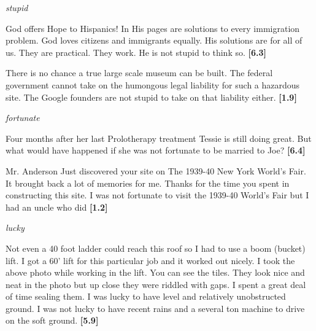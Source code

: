 \documentclass[11pt,fleqn]{article}
\newcommand{\6}{\mbox{$[\hspace*{-.6mm}[$}}
\newcommand{\9}{\mbox{$]\hspace*{-.6mm}]$}}
\begin{document}
\begin{exe}


\ex\label{stupid} {\em stupid}

\begin{xlist}

\ex God offers Hope to Hispanics! In His pages are solutions to every immigration problem. God loves citizens and immigrants equally. His solutions are for all of us. They are practical. They work. He is not stupid to think so. \hfill {\bf [6.3]}

\ex There is no chance a true large scale museum can be built. The federal government cannot take on the humongous legal liability for such a hazardous site. The Google founders are not stupid to take on that liability either. \hfill {\bf [1.9]}

\end{xlist}

\ex\label{fort} {\em fortunate}

\begin{xlist}

\ex Four months after her last Prolotherapy treatment  Tessie is still
doing great. But what would have happened if she was not
fortunate to be married to Joe? \hfill {\bf [6.4]}

\ex\label{fair}  Mr. Anderson  Just discovered your site on The 1939-40 New York World's Fair. It brought back a lot of memories for me. Thanks for the time you spent in constructing this site. I was not fortunate to visit the 1939-40 World's Fair but I had an uncle who did \hfill {\bf [1.2]}

\end{xlist}

\ex\label{lucky} {\em lucky}

\begin{xlist}

\ex Not even a 40 foot ladder could reach this roof  so I had to use a boom (bucket) lift. I got a 60' lift for this particular job  and it worked out nicely. I took the above photo while working in the lift. You can see the tiles. They look nice and neat in the photo  but up close  they were riddled with gaps. I spent a great deal of time sealing them. I was lucky to have level and relatively unobstructed ground. I was not lucky to have recent rains and a several ton machine to drive on the soft ground. \hfill {\bf [5.9]}



\end{xlist}
\end{exe}
\end{document}
